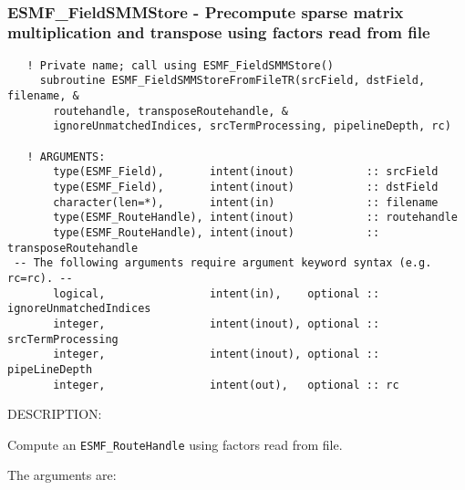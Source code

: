  
\mbox{}\hrulefill\ 
 
\subsubsection [ESMF\_FieldSMMStore] {ESMF\_FieldSMMStore - Precompute sparse matrix multiplication and transpose using factors read from file}


  
\begin{verbatim}   ! Private name; call using ESMF_FieldSMMStore()
     subroutine ESMF_FieldSMMStoreFromFileTR(srcField, dstField, filename, &
       routehandle, transposeRoutehandle, &
       ignoreUnmatchedIndices, srcTermProcessing, pipelineDepth, rc)
 
   ! ARGUMENTS:
       type(ESMF_Field),       intent(inout)           :: srcField  
       type(ESMF_Field),       intent(inout)           :: dstField
       character(len=*),       intent(in)              :: filename
       type(ESMF_RouteHandle), intent(inout)           :: routehandle
       type(ESMF_RouteHandle), intent(inout)           :: transposeRoutehandle
 -- The following arguments require argument keyword syntax (e.g. rc=rc). --
       logical,                intent(in),    optional :: ignoreUnmatchedIndices
       integer,                intent(inout), optional :: srcTermProcessing
       integer,                intent(inout), optional :: pipeLineDepth
       integer,                intent(out),   optional :: rc\end{verbatim}
{\sf DESCRIPTION:\\ }


  
   Compute an {\tt ESMF\_RouteHandle} using factors read from file.
  
   The arguments are:
  
